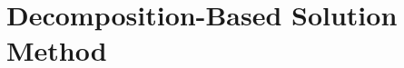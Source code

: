 \documentclass[11pt]{article}
\begin{document}
% 

\section{Decomposition-Based Solution Method} \label{sec:soln_algorithm}
\end{document}
